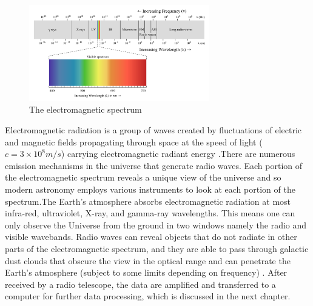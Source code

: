 \begin{figure}[h!]
  \centering
    \includegraphics[width=0.7\textwidth]{images/Electromagnetic-Spectrum.png}
    \caption{The electromagnetic spectrum \citep{ElectromagneticSpectrum}}
  \label{images/Electromagnetic-Spectrum.png}
\end{figure}

Electromagnetic radiation is a group of waves created by fluctuations of electric and magnetic fields propagating through space at the speed of light ($c=3\times 10^{8} m/s$) carrying electromagnetic radiant energy \citep{ElectromagneticSpectrum}.\;There are numerous emission mechanisms in the universe that generate radio waves.
Each portion of the electromagnetic spectrum reveals a unique view of the universe and so modern astronomy employs various instruments to look at each portion of the spectrum.\;The Earth's atmosphere absorbs electromagnetic radiation at most infra-red, ultraviolet, X-ray, and gamma-ray wavelengths. This means one can only observe the Universe from the ground in two windows namely the radio and visible wavebands. Radio waves can reveal objects that do not radiate in other parts of the electromagnetic spectrum, and they are able to pass through galactic dust clouds that obscure the view in the optical range and can penetrate the Earth's atmosphere (subject to some limits depending on frequency) \citep{thompson2001interferometry}. After received by a radio telescope, the data are amplified and transferred to a computer for further  data processing, which is discussed in the next chapter.



